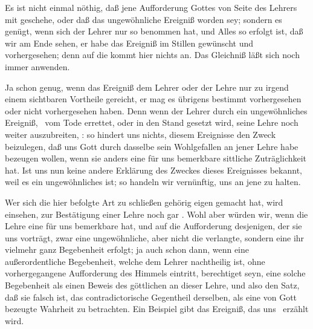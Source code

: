 \begin{aufza}
\begin{aufzb}
\item Es ist nicht einmal nöthig, daß jene Aufforderung Gottes von Seite des Lehrers mit  geschehe, oder daß das ungewöhnliche Ereigniß  worden sey; sondern es genügt, wenn sich der Lehrer nur so benommen hat, und Alles so erfolgt ist, daß wir am Ende sehen, er habe das Ereigniß im Stillen gewünscht und vorhergesehen; denn auf die  kommt hier nichts an. Das Gleichniß läßt sich noch immer anwenden.
\item Ja schon genug, wenn das Ereigniß dem Lehrer oder der Lehre nur zu irgend einem sichtbaren Vortheile gereicht, er mag es übrigens bestimmt vorhergesehen oder nicht vorhergesehen haben. Denn wenn der Lehrer durch ein ungewöhnliches Ereigniß, \zB\ vom Tode errettet, oder in den Stand gesetzt wird, seine Lehre noch weiter auszubreiten, \usw: so hindert uns nichts, diesem Ereignisse den Zweck beizulegen, daß uns Gott durch dasselbe sein Wohlgefallen an jener Lehre habe bezeugen wollen, wenn sie anders eine für uns bemerkbare sittliche Zuträglichkeit hat. Ist uns nun keine andere Erklärung des Zweckes dieses Ereignisses bekannt, weil es ein ungewöhnliches ist; so handeln wir vernünftig, uns an jene zu halten.
\end{aufzb}
\begin{RWanm}
Wer sich die hier befolgte Art zu schließen gehörig eigen gemacht hat, wird einsehen,  zur Bestätigung einer Lehre noch gar . Wohl aber würden wir, wenn die Lehre eine für uns bemerkbare  hat, und auf die Aufforderung desjenigen, der sie uns vorträgt, zwar eine ungewöhnliche, aber nicht die verlangte, sondern eine ihr vielmehr ganz  Begebenheit erfolgt; ja auch schon dann, wenn eine außerordentliche Begebenheit, welche dem Lehrer nachtheilig ist, ohne vorhergegangene Aufforderung des Himmels eintritt, berechtiget seyn, eine solche Begebenheit als einen Beweis des göttlichen  an dieser Lehre, und also den Satz, daß sie falsch ist, das contradictorische Gegentheil derselben, als eine von Gott bezeugte Wahrheit zu betrachten. Ein Beispiel gibt das Ereigniß, das uns \ erzählt wird. 
\end{RWanm}

\end{aufza}
